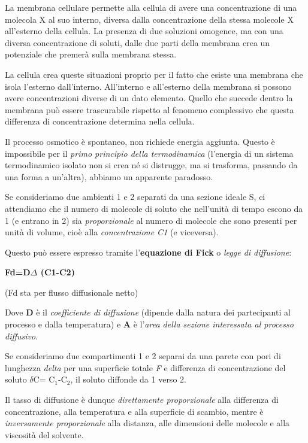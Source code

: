 \documentclass[]{article}
\begin{document}
La membrana cellulare permette alla cellula di avere una concentrazione
di una molecola X al suo interno, diversa dalla concentrazione della
stessa molecole X all'esterno della cellula. La presenza di due
soluzioni omogenee, ma con una diversa concentrazione di soluti, dalle
due parti della membrana crea un potenziale che premerà sulla membrana
stessa.

La cellula crea queste situazioni proprio per il fatto che esiste una
membrana che isola l'esterno dall'interno. All'interno e all'esterno
della membrana si possono avere concentrazioni diverse di un dato
elemento. Quello che succede dentro la membrana può essere trascurabile
rispetto al fenomeno complessivo che questa differenza di concentrazione
determina nella cellula.

Il processo osmotico è spontaneo, non richiede energia aggiunta. Questo
è impossibile per il \emph{primo principio della termodinamica}
(l'energia di un sistema termodinamico isolato non si crea né si
distrugge, ma si trasforma, passando da una forma a un'altra), abbiamo
un apparente paradosso.

Se consideriamo due ambienti 1 e 2 separati da una sezione ideale S, ci
attendiamo che il numero di molecole di soluto che nell'unità di tempo
escono da 1 (e entrano in 2) sia \emph{proporzionale} al numero di
molecole che sono presenti per unità di volume, cioè alla
\emph{concentrazione C1} (e viceversa).

Questo può essere espresso tramite l'\textbf{equazione di Fick} o
\emph{legge di diffusione}:

\textbf{Fd=D\(\Delta\) (C1-C2)}

(Fd sta per flusso diffusionale netto)

Dove \textbf{D} è il \emph{coefficiente di diffusione} (dipende dalla
natura dei partecipanti al processo e dalla temperatura) e \textbf{A} è
l'\emph{area della sezione interessata al processo diffusivo}.

Se consideriamo due compartimenti 1 e 2 separai da una parete con pori
di lunghezza \emph{delta} per una superficie totale \emph{F} e
differenza di concentrazione del soluto \(\delta\)C= C\(_1\)-C\(_2\), il
soluto diffonde da 1 verso 2.

Il tasso di diffusione è dunque \emph{direttamente proporzionale} alla
differenza di concentrazione, alla temperatura e alla superficie di
scambio, mentre è \emph{inversamente proporzionale} alla distanza, alle
dimensioni delle molecole e alla viscosità del solvente.
\end{document}

